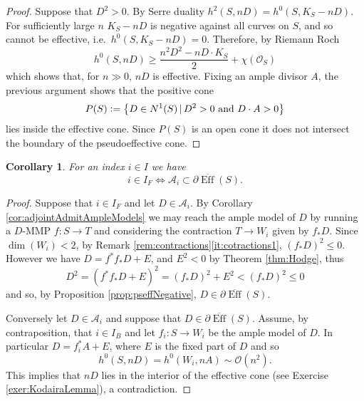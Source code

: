 \documentclass[a4paper,11pt]{amsart}
\newtheorem{corollary}[theorem]{Corollary}
\def\dim{\operatorname{dim}}
\def\Eff{\operatorname{Eff}}
\newcommand{\OO}{\mathcal{O}}
\newcommand{\Aa}{\mathcal{A}}
\newcommand{\defeq}{\vcentcolon=}
\begin{document}
\begin{proof}
	Suppose that $D^2 > 0$.
	By Serre duality $h^2(S,nD) = h^0(S,K_S - nD)$.
	For sufficiently large $n$ $K_S - nD$ is negative against all curves on $S$, and so cannot be effective, i.e.\ $h^0(S,K_S - nD) = 0$.
	Therefore, by Riemann Roch
	\[
	h^0(S,nD) \geq \frac{n^2D^2 - nD\cdot K_S}{2} + \chi(\OO_S)
	\]
	which shows that, for $n\gg 0$, $nD$ is effective.
	Fixing an ample divisor $A$, the previous argument shows that the positive cone
	\[
	P(S) \defeq 
	\left\{D \in N^1(S) \, | \, D^2 > 0 \text{ and } D\cdot A > 0\right\}
	\]
	lies inside the effective cone.
	Since $P(S)$ is an open cone it does not intersect the boundary of the pseudoeffective cone.
\end{proof}



\begin{corollary}\label{cor:smallChambers}
	For an index $i\in I$ we have
	\[
	i \in I_F \iff \Aa_i \subset \partial\overline{\Eff}(S).
	\]
\end{corollary}

\begin{proof}
	Suppose that $i \in I_F$ and let $D\in \Aa_i$.
	By Corollary \ref{cor:adjointAdmitAmpleModels} we may reach the ample model of $D$ by running a $D$-MMP $f\colon S \to T$ and considering the contraction $T \to W_i$ given by $f_*D$.
	Since $\dim(W_i) < 2$, by Remark \ref{rem:contractions}\eqref{it:cotractions1}, $(f_*D)^2 \leq 0$.
	However we have $D = f^*f_*D + E$, and $E^2 < 0$ by Theorem \ref{thm:Hodge}, thus
	\[
	D^2 = \left(f^*f_*D + E\right)^2 = (f_*D)^2 + E^2 < (f_*D)^2 \leq 0
	\]
	and so, by Proposition \ref{prop:pseffNegative}, $D \in \partial\overline{\Eff}(S)$.
	
	Conversely let $D\in \Aa_i$ and suppose that $D \in \partial\overline{\Eff}(S)$.
	Assume, by contraposition, that $i \in I_B$ and let $f_i \colon S \to W_i$ be the ample model of $D$.
	In particular $D = f_i^*A +E$, where $E$ is the fixed part of $D$ and so
	\[
	h^0(S,nD) = h^0(W_i,nA) \sim \OO(n^2).
	\]
	This implies that $nD$ lies in the interior of the effective cone (see Exercise \ref{exer:KodairaLemma}), a contradiction.
\end{proof}
\end{document}
